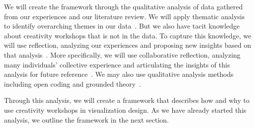 We will create the framework through the qualitative analysis of data gathered from our experiences and our literature review. We will apply thematic analysis to identify overarching themes in our data~\cite{Braun2006}. But we also have tacit knowledge about creativity workshops that is not in the data. To capture this knowledge, we will use reflection, analyzing our experiences and proposing new insights based on that analysis~\cite{Boud1985}. More specifically, we will use collaborative reflection, analyzing many individuals' collective experience and articulating the insights of this analysis for future reference~\cite{Prilla2012}. We may also use qualitative analysis methods including open coding and grounded theory~\cite{Corbin1990}.

Through this analysis, we will create a framework that describes how and why to use creativity workshops in visualization design. As we have already started this analysis, we outline the framework in the next section.



